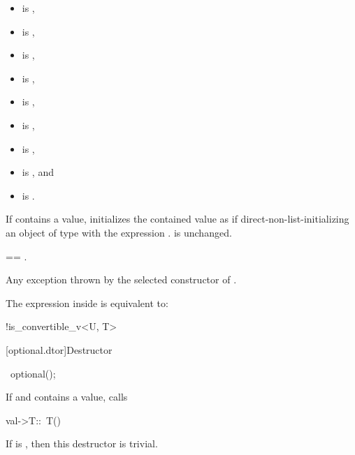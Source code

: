 \begin{itemdescr}
\pnum
\constraints
\begin{itemize}
\item {} is ,
\item {} is ,
\item {} is ,
\item {} is ,
\item {} is ,
\item {} is ,
\item {} is ,
\item {} is , and
\item {} is .
\end{itemize}

\pnum
\effects
If  contains a value,
initializes the contained value as if direct-non-list-initializing
an object of type  with the expression .
 is unchanged.

\pnum
\ensures
{} == .

\pnum
\throws
Any exception thrown by the selected constructor of .

\pnum
\remarks
The expression inside  is equivalent to:
\begin{codeblock}
!is_convertible_v<U, T>
\end{codeblock}
\end{itemdescr}

[optional.dtor]{Destructor}

%
\begin{itemdecl}
~optional();
\end{itemdecl}

\begin{itemdescr}
\pnum
\effects
If  and  contains a value, calls
\begin{codeblock}
val->T::~T()
\end{codeblock}

\pnum
\remarks
If  is , then this destructor is trivial.
\end{itemdescr}

